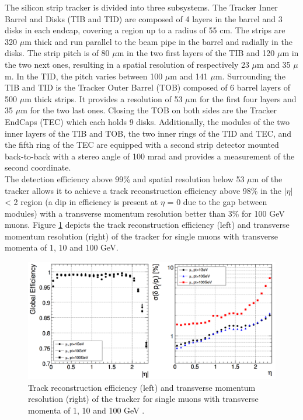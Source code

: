     The silicon strip tracker is divided into three subsystems. The Tracker Inner Barrel and Disks (TIB and TID) are composed of 4 layers in the barrel and 3 disks in each endcap, covering a region up to a radius of 55 cm. The strips are 320 $\mu$m thick and run parallel to the beam pipe in the barrel and radially in the disks. The strip pitch is of 80 $\mu$m in the two first layers of the TIB and 120 $\mu$m in the two next ones, resulting in a spatial resolution of respectively 23 $\mu$m and 35 $\mu$m. In the TID, the pitch varies between 100 $\mu$m and 141 $\mu$m. Surrounding the TIB and TID is the Tracker Outer Barrel (TOB) composed of 6 barrel layers of 500 $\mu$m thick strips. It provides a resolution of 53 $\mu$m for the first four layers and 35 $\mu$m for the two last ones. Closing the TOB on both sides are the Tracker EndCaps (TEC) which each holds 9 disks. Additionally, the modules of the two inner layers of the TIB and TOB, the two inner rings of the TID and TEC, and the fifth ring of the TEC are equipped with a second strip detector mounted back-to-back with a stereo angle of 100 mrad and provides a measurement of the second coordinate. \\

    The detection efficiency above 99\% and spatial resolution below 53 $\mu$m of the tracker allows it to achieve a track reconstruction efficiency above 98\% in the $|\eta|$ < 2 region (a dip in efficiency is present at $\eta$ = 0 due to the gap between modules) with a transverse momentum resolution better than 3\% for 100 GeV muons. Figure \ref{fig:I-3-tracker-eff} depicts the track reconstruction efficiency (left) and transverse momentum resolution (right) of the tracker for single muons with transverse momenta of 1, 10 and 100 GeV. \\

    \begin{figure}[b!]
      \centering
      \includegraphics[width=\textwidth]{img/I-3-cms/tracker_efficiency.png}
      \caption{Track reconstruction efficiency (left) and transverse momentum resolution (right) of the tracker for single muons with transverse momenta of 1, 10 and 100 GeV \cite{1748-0221-3-08-S08004}.}
      \label{fig:I-3-tracker-eff}
    \end{figure}

